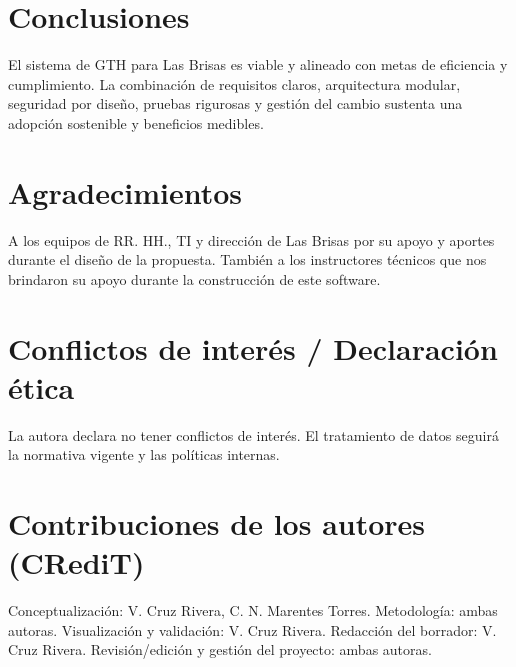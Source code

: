 \section{Conclusiones}
El sistema de GTH para Las Brisas es viable y alineado con metas de eficiencia y cumplimiento. La combinación de requisitos claros, arquitectura modular, seguridad por diseño, pruebas rigurosas y gestión del cambio sustenta una adopción sostenible y beneficios medibles.

\section{Agradecimientos}
A los equipos de RR. HH., TI y dirección de Las Brisas por su apoyo y aportes durante el diseño de la propuesta. También a los instructores técnicos que nos brindaron su apoyo durante la construcción de este software.

\section{Conflictos de interés / Declaración ética}
La autora declara no tener conflictos de interés. El tratamiento de datos seguirá la normativa vigente y las políticas internas.

\section{Contribuciones de los autores (CRediT)}
Conceptualización: V. Cruz Rivera, C. N. Marentes Torres. Metodología: ambas autoras. Visualización y validación: V. Cruz Rivera. Redacción del borrador: V. Cruz Rivera. Revisión/edición y gestión del proyecto: ambas autoras.